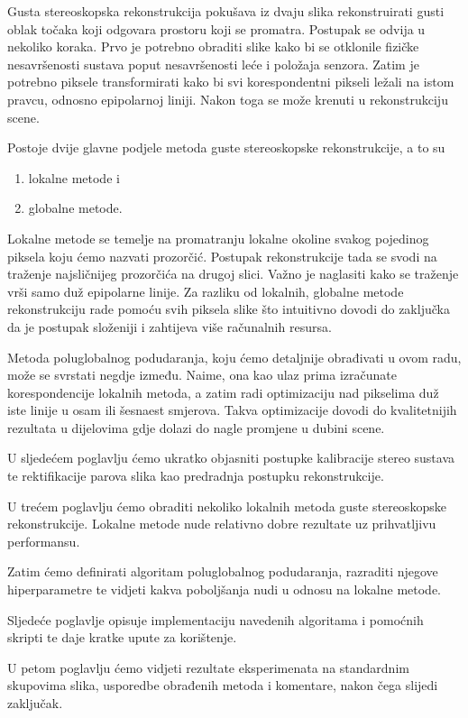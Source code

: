 \documentclass[utf8, zavrsni, numeric]{fer}
\begin{document}
Gusta stereoskopska rekonstrukcija pokušava iz dvaju slika rekonstruirati gusti oblak točaka koji
odgovara prostoru koji se promatra. Postupak se odvija u nekoliko koraka.
Prvo je potrebno obraditi slike kako bi se otklonile fizičke nesavršenosti sustava poput nesavršenosti leće i položaja senzora. Zatim je potrebno piksele
transformirati kako bi svi korespondentni pikseli ležali na istom pravcu, odnosno epipolarnoj liniji. Nakon toga se može krenuti u rekonstrukciju scene.

Postoje dvije glavne podjele metoda guste stereoskopske rekonstrukcije, a to su
\begin{enumerate}
  \item lokalne metode i
  \item globalne metode.
\end{enumerate}

Lokalne metode se temelje na promatranju lokalne okoline svakog pojedinog piksela koju ćemo nazvati prozorčić.
Postupak rekonstrukcije tada se svodi na traženje najsličnijeg prozorčića na drugoj slici. Važno je naglasiti kako se traženje vrši samo duž epipolarne linije.
Za razliku od lokalnih, globalne metode rekonstrukciju rade pomoću svih piksela slike što intuitivno dovodi do zaključka da je postupak složeniji i zahtijeva više računalnih resursa.

Metoda poluglobalnog podudaranja, koju ćemo detaljnije obrađivati u ovom radu, može se svrstati negdje između. Naime, ona kao ulaz prima izračunate korespondencije lokalnih metoda, a zatim radi optimizaciju nad pikselima duž iste linije u osam ili šesnaest smjerova.
Takva optimizacije dovodi do kvalitetnijih rezultata u dijelovima gdje dolazi do nagle promjene u dubini scene.

U sljedećem poglavlju ćemo ukratko objasniti postupke kalibracije stereo sustava te rektifikacije parova slika kao predradnja postupku rekonstrukcije.

U trećem poglavlju ćemo obraditi nekoliko lokalnih metoda guste stereoskopske rekonstrukcije. Lokalne metode nude relativno dobre rezultate uz prihvatljivu performansu.

Zatim ćemo definirati algoritam poluglobalnog podudaranja, razraditi njegove hiperparametre te vidjeti kakva poboljšanja nudi u odnosu na lokalne metode.

Sljedeće poglavlje opisuje implementaciju navedenih algoritama i pomoćnih skripti te daje kratke upute za korištenje.

U petom poglavlju ćemo vidjeti rezultate eksperimenata na standardnim skupovima slika, usporedbe obrađenih metoda i komentare, nakon čega slijedi zaključak.
\end{document}

